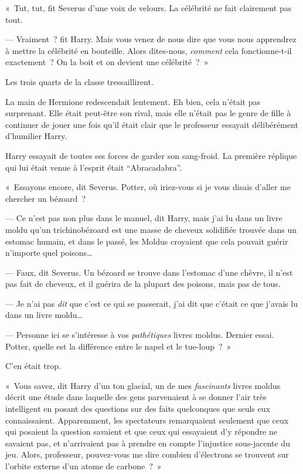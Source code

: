 «~Tut, tut, fit Severus d'une voix de velours.
La célébrité ne fait clairement pas tout.

--- Vraiment~? fit Harry.
Mais vous venez de nous dire que vous nous apprendrez à mettre la célébrité en bouteille.
Alors dites-nous, \emph{comment} cela fonctionne-t-il exactement~?
On la boit et on devient une célébrité~?~»

Les trois quarts de la classe tressaillirent.

La main de Hermione redescendait lentement.
Eh bien, cela n'était pas surprenant.
Elle était peut-être son rival, mais elle n'était pas le genre de fille à continuer de jouer une fois qu'il était clair que le professeur essayait délibérément d'humilier Harry.

Harry essayait de toutes ses forces de garder son sang-froid.
La première réplique qui lui était venue à l'esprit était “Abracadabra”.

«~Essayons encore, dit Severus.
Potter, où iriez-vous si je vous disais d'aller me chercher un bézoard~?

--- Ce n'est pas non plus dans le manuel, dit Harry, mais j'ai lu dans un livre moldu qu'un trichinobézoard est une masse de cheveux solidifiée trouvée dans un estomac humain, et dans le passé, les Moldus croyaient que cela pouvait guérir n'importe quel poisons…

--- Faux, dit Severus.
Un bézoard se trouve dans l'estomac d'une chèvre, il n'est pas fait de cheveux, et il guérira de la plupart des poisons, mais pas de tous.

--- Je n'ai pas \emph{dit} que c'est ce qui se passerait, j'ai dit que c'était ce que j'avais lu dans un livre moldu…

--- Personne ici se s'intéresse à vos \emph{pathétiques} livres moldus.
Dernier essai.
Potter, quelle est la différence entre le napel et le tue-loup~?~»

C'en était trop.

«~Vous savez, dit Harry d'un ton glacial, un de mes \emph{fascinants} livres moldus décrit une étude dans laquelle des gens parvenaient à se donner l'air très intelligent en posant des questions sur des faits quelconques que seuls eux connaissaient.
Apparemment, les spectateurs remarquaient seulement que ceux qui posaient la question savaient et que ceux qui essayaient d'y répondre ne savaient pas, et n'arrivaient pas à prendre en compte l'injustice sous-jacente du jeu.
Alors, professeur, pouvez-vous me dire combien d'électrons se trouvent sur l'orbite externe d'un atome de carbone~?~»

